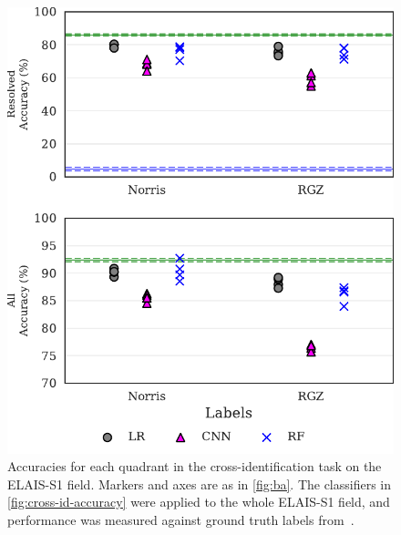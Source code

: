 \documentclass[fleqn,usenatbib,usedcolumn]{mnras}
\begin{document}
  \begin{figure}
    \centering
    \includegraphics[width=\columnwidth]{images/elais_cross_identification_grid.pdf}
    \caption{Accuracies for each quadrant in the cross-identification
      task on the ELAIS-S1 field. Markers and axes are as in \autoref{fig:ba}.
      The classifiers in \autoref{fig:cross-id-accuracy} were applied to the
      whole ELAIS-S1 field, and performance was measured against ground truth
      labels from~\citet{middelberg08}.
      \label{fig:elais-cross-id-accuracy}}
  \end{figure}
\end{document}
